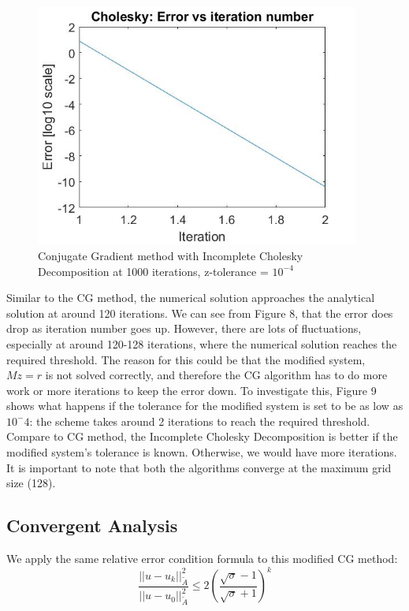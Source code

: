 \documentclass{article}
\begin{document}
\begin{figure}[H]
	\includegraphics[width=\linewidth,height=80mm]{Cholesky_error_cg1e4.jpg}
	\caption{Conjugate Gradient method with Incomplete Cholesky Decomposition at 1000 iterations, z-tolerance = $10^{-4}$}	
\end{figure}

\noindent
Similar to the CG method, the numerical solution approaches the analytical solution at around 120 iterations. We can see from Figure 8, that the error does drop as iteration number goes up.  However, there are lots of fluctuations, especially at around 120-128 iterations, where the numerical solution reaches the required threshold. The reason for this could be that the modified system, $Mz = r$ is not solved correctly, and therefore the CG algorithm has to do more work or more iterations to keep the error down.  To investigate this, Figure 9 shows what happens if the tolerance for the modified system is set to be as low as $10^-4$: the scheme takes around 2 iterations to reach the required threshold.  Compare to CG method, the Incomplete Cholesky Decomposition is better if the modified system's tolerance is known.  Otherwise, we would have more iterations.  It is important to note that both the algorithms converge at the maximum grid size (128).  
\subsection{Convergent Analysis}
We apply the same relative error condition formula to this modified CG method: 
\begin{equation*}
	\dfrac{||u-u_k||_{\tilde{A}}^2}{||u-u_0||_{\tilde{A}}^2} \leq 2\left(\dfrac{\sqrt{\sigma }-1}{\sqrt{\sigma}+1} \right)^k
\end{equation*}
\end{document}
